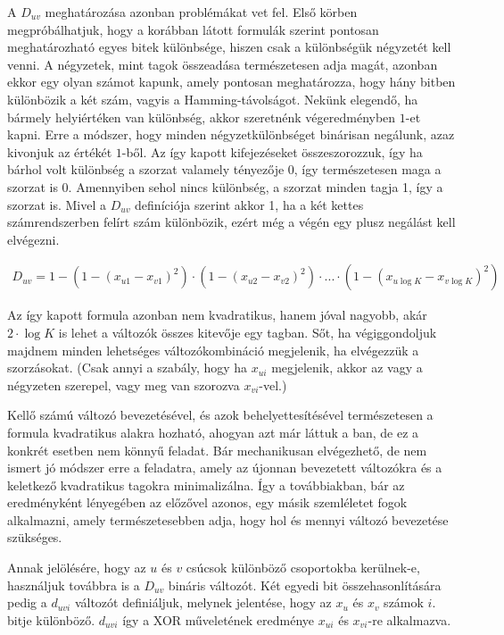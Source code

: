 A $D_{uv}$ meghatározása azonban problémákat vet fel. Első körben megpróbálhatjuk, hogy a korábban látott formulák szerint pontosan meghatározható egyes bitek különbsége, hiszen csak a különbségük négyzetét kell venni. A négyzetek, mint tagok összeadása természetesen adja magát, azonban ekkor egy olyan számot kapunk, amely pontosan meghatározza, hogy hány bitben különbözik a két szám, vagyis a Hamming-távolságot. Nekünk elegendő, ha bármely helyiértéken van különbség, akkor szeretnénk végeredményben $1$-et kapni. Erre a módszer, hogy minden négyzetkülönbséget binárisan negálunk, azaz kivonjuk az értékét $1$-ből. Az így kapott kifejezéseket összeszorozzuk, így ha bárhol volt különbség a szorzat valamely tényezője 0, így természetesen maga a szorzat is 0. Amennyiben sehol nincs különbség, a szorzat minden tagja 1, így a szorzat is. Mivel a $D_{uv}$ definíciója szerint akkor 1, ha a két kettes számrendszerben felírt szám különbözik, ezért még a végén egy plusz negálást kell elvégezni.

\begin{align}	
	D_{uv} = 1-  \left( 1-(x_{u1}-x_{v1})^2 \right) \cdot \left( 1-(x_{u2}-x_{v2})^2 \right) \cdot ...  \cdot \left( 1-(x_{u\log K}-x_{v \log K})^2 \right) 
\end{align}

Az így kapott formula azonban nem kvadratikus, hanem jóval nagyobb, akár $2 \cdot \log K$ is lehet a változók összes kitevője egy tagban. Sőt, ha végiggondoljuk majdnem minden lehetséges változókombináció megjelenik, ha elvégezzük a szorzásokat. (Csak annyi a szabály, hogy ha $x_{ui}$ megjelenik, akkor az vagy a négyzeten szerepel, vagy meg van szorozva $x_{vi}$-vel.)

Kellő számú változó bevezetésével, és azok behelyettesítésével természetesen a formula kvadratikus alakra hozható, ahogyan azt már láttuk a ban, de ez a konkrét esetben nem könnyű feladat. Bár mechanikusan elvégezhető, de nem ismert jó módszer erre a feladatra, amely az újonnan bevezetett változókra és a keletkező kvadratikus tagokra minimalizálna. Így a továbbiakban, bár az eredményként lényegében az előzővel azonos, egy másik szemléletet fogok alkalmazni, amely természetesebben adja, hogy hol és mennyi változó bevezetése szükséges.


Annak jelölésére, hogy az $u$ és $v$ csúcsok különböző csoportokba kerülnek-e, használjuk továbbra is a $D_{uv}$ bináris változót. Két egyedi bit összehasonlítására pedig a $d_{uvi}$ változót definiáljuk, melynek jelentése, hogy az $x_u$ és $x_v$ számok $i.$ bitje különböző. $d_{uvi}$ így a XOR műveletének eredménye $x_{ui}$ és  $x_{vi}$-re alkalmazva.

